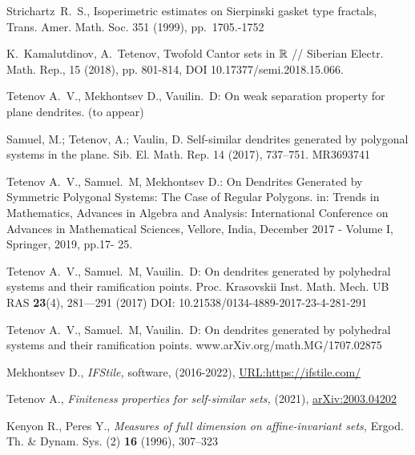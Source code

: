 \begin{thebibliography}{99}
 {Strichartz~R.~S.}, Isoperimetric estimates on Sierpinski gasket type fractals, Trans. Amer.
Math. Soc. 351 (1999), pp.~1705.-1752

 {K.~Kamalutdinov, A.~Tetenov},  
Twofold Cantor sets in $\mathbb{R}$ // Siberian Electr. Math. Rep., 15 (2018), pp. 801-814, DOI 10.17377/semi.2018.15.066.



Tetenov A.~V., Mekhontsev D., Vauilin.~D: On weak separation property for plane dendrites. 	(to appear)

Samuel, M.; Tetenov, A.; Vaulin, D. Self-similar dendrites generated by polygonal systems in the plane. Sib. El. Math. Rep. 14 (2017), 737--751. MR3693741

Tetenov A.~V., Samuel.~M, Mekhontsev D.:
On Dendrites Generated by Symmetric 
Polygonal Systems: The Case of Regular 
Polygons. in:  Trends in Mathematics, Advances in Algebra and Analysis: International Conference on Advances in Mathematical Sciences, Vellore, India, December 2017 - Volume I,  Springer, 2019, pp.17- 25.

Tetenov A.~V., Samuel.~M, Vauilin.~D:
On dendrites generated by polyhedral systems and their ramification points.  Proc.  Krasovskii Inst. Math. Mech. UB RAS \textbf{23}(4), 281---291 (2017) DOI: 10.21538/0134-4889-2017-23-4-281-291


Tetenov A.~V., Samuel.~M, Vauilin.~D:
On dendrites generated by polyhedral systems and their ramification points.   www.arXiv.org/math.MG/1707.02875





    {\sc Mekhontsev D.,}
    {\em IFStile,} 
    {software, (2016-2022), \href{https://ifstile.com/}{URL:https://ifstile.com/}} 

    {\sc Tetenov A.,} 
    {\em Finiteness properties for self-similar sets,} (2021),
    \href{https://arxiv.org/abs/2003.04202}{arXiv:2003.04202} 

    {\sc Kenyon R., Peres Y.,} 
    {\em Measures of full dimension on affine-invariant sets,}
    {Ergod. Th. \& Dynam. Sys. (2) \textbf{16} (1996), 307--323}


\end{thebibliography}
